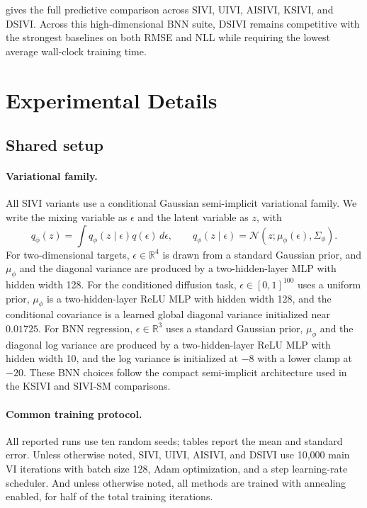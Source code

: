 

 gives the full predictive comparison across SIVI, UIVI, AISIVI, KSIVI, and DSIVI.  Across this high-dimensional BNN suite, DSIVI remains competitive with the strongest baselines on both RMSE and NLL while requiring the lowest average wall-clock training time.

\clearpage
\appendix

\section{Experimental Details}
\label{app:experiment-details}

\subsection{Shared setup}
\label{app:shared-setup}

\paragraph{Variational family.}
All SIVI variants use a conditional Gaussian semi-implicit variational family.  We write the mixing variable as $\epsilon$ and the latent variable as $z$, with
\begin{equation}
  q_\phi(z)
  =
  \int q_\phi(z \mid \epsilon) q(\epsilon)\,d\epsilon,
  \qquad
  q_\phi(z \mid \epsilon)
  =
  \mathcal{N}\!\left(z;\mu_\phi(\epsilon),\Sigma_\phi\right).
\end{equation}
For two-dimensional targets, $\epsilon \in \mathbb{R}^{4}$ is drawn from a standard Gaussian prior, and $\mu_\phi$ and the diagonal variance are produced by a two-hidden-layer MLP with hidden width 128.  For the conditioned diffusion task, $\epsilon \in [0,1]^{100}$ uses a uniform prior, $\mu_\phi$ is a two-hidden-layer ReLU MLP with hidden width 128, and the conditional covariance is a learned global diagonal variance initialized near $0.01725$.  For BNN regression, $\epsilon \in \mathbb{R}^{3}$ uses a standard Gaussian prior, $\mu_\phi$ and the diagonal log variance are produced by a two-hidden-layer ReLU MLP with hidden width 10, and the log variance is initialized at $-8$ with a lower clamp at $-20$.  These BNN choices follow the compact semi-implicit architecture used in the KSIVI and SIVI-SM comparisons.

\paragraph{Common training protocol.}
All reported runs use ten random seeds; tables report the mean and standard error.  Unless otherwise noted, SIVI, UIVI, AISIVI, and DSIVI use 10,000 main VI iterations with batch size 128, Adam optimization, and a step learning-rate scheduler. And unless otherwise noted, all methods are trained with annealing enabled, for half of the total training iterations.

